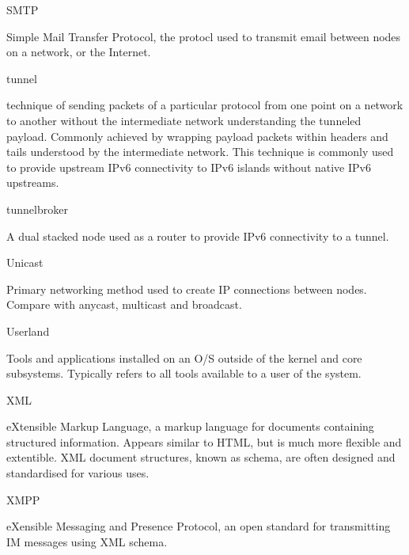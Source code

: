 SMTP

Simple Mail Transfer Protocol, the protocl used to transmit email
between nodes on a network, or the Internet.

tunnel

technique of sending packets of a particular protocol from one point on
a network to another without the intermediate network understanding the
tunneled payload. Commonly achieved by wrapping payload packets within
headers and tails understood by the intermediate network. This
technique is commonly used to provide upstream IPv6 connectivity to IPv6
islands without native IPv6 upstreams.

tunnelbroker

A dual stacked node used as a router to provide IPv6 connectivity to a
tunnel.

Unicast

Primary networking method used to create IP connections between nodes.
Compare with anycast, multicast and broadcast.

Userland

Tools and applications installed on an O/S outside of the kernel and
core subsystems. Typically refers to all tools available to a user of
the system.

XML

eXtensible Markup Language, a markup language for documents containing
structured information. Appears similar to HTML, but is much more
flexible and extentible. XML document structures, known as schema, are
often designed and standardised for various uses.

XMPP

eXensible Messaging and Presence Protocol, an open standard for
transmitting IM messages using XML schema.
